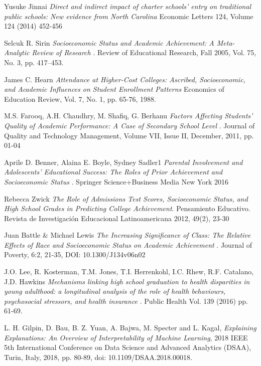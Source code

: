 \documentclass[sigconf,nonacm,11pt]{acmart}
\begin{document}
\begin{thebibliography}{9}
Yusuke Jinnai
\textit{Direct and indirect impact of charter schools’ entry on traditional public schools: New evidence from North Carolina}
Economic Letters 124, Volume 124 (2014) 452-456

Selcuk R. Sirin
\textit{Socioeconomic Status and Academic Achievement: A Meta-Analytic Review of Research }. 
Review of Educational Research, Fall 2005, Vol. 75, No. 3, pp. 417–453.

James C. Hearn
\textit{Attendance at Higher-Cost Colleges: Ascribed, Socioeconomic, and Academic Influences on Student Enrollment Patterns}
Economics of Education Review, Vol. 7, No.  1, pp. 65-76, 1988.

M.S. Farooq, A.H. Chaudhry, M. Shafiq, G. Berhanu
\textit{Factors Affecting Students' Quality of Academic Performance: A Case of Secondary School Level }.
Journal of Quality and Technology Management, Volume VII, Issue II, December, 2011, pp. 01-04

Aprile D. Benner, Alaina E. Boyle, Sydney Sadler1
\textit{ Parental Involvement and Adolescents’ Educational Success: The Roles of Prior Achievement and Socioeconomic Status }. 
Springer Science+Business Media New York 2016

Rebecca Zwick 
\textit{The Role of Admissions Test Scores, Socioeconomic Status, and High School Grades in Predicting College Achievement}. 
Pensamiento Educativo. Revista de Investigación Educacional Latinoamericana 2012, 49(2), 23-30

Juan Battle \& Michael Lewis
\textit{ The Increasing Significance of Class: The Relative Effects of Race and Socioeconomic Status on Academic Achievement }. 
Journal of Poverty, 6:2, 21-35, DOI: 10.1300/J134v06n02

J.O. Lee, R. Kosterman, T.M. Jones, T.I. Herrenkohl, I.C. Rhew, R.F. Catalano, J.D. Hawkins
\textit{ Mechanisms linking high school graduation to health disparities in young adulthood: a longitudinal analysis of the role of health behaviours, psychosocial stressors, and health insurance }. 
Public Health Vol. 139 (2016) pp. 61-69.

L. H. Gilpin, D. Bau, B. Z. Yuan, A. Bajwa, M. Specter and L. Kagal, 
\textit{Explaining Explanations: An Overview of Interpretability of Machine Learning}, 2018 IEEE 5th International Conference on Data Science and Advanced Analytics (DSAA), Turin, Italy, 2018, pp. 80-89, doi: 10.1109/DSAA.2018.00018.


\end{thebibliography}
\end{document}
